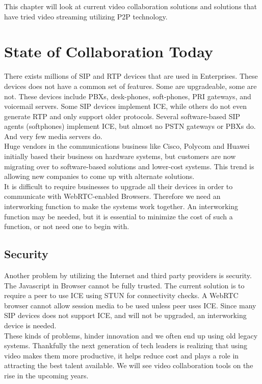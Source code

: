 This chapter will look at current video collaboration solutions and solutions that have tried video streaming utilizing P2P technology.

\section{State of Collaboration Today}
There exists millions of SIP and RTP devices that are used in Enterprises. These devices does not have a common set of features. Some are upgradeable, some are not. These devices include PBXs, desk-phones, soft-phones, PRI gateways, and voicemail servers. Some SIP devices implement ICE, while others do not even generate RTP and only support older protocols. Several software-based SIP agents (softphones) implement ICE, but almost no
PSTN gateways or PBXs do. And very few media servers do.
\\

Huge vendors in the communications business like Cisco, Polycom and Huawei initially based their business on hardware systems, but customers are now migrating over to software-based solutions and lower-cost systems. This trend is allowing new companies to come up with alternate solutions.
\\
It is difficult to require businesses to upgrade all their devices in order to communicate with WebRTC-enabled Browsers. Therefore we need an interworking function to make the systems work together. An interworking function may be needed, but it is essential to minimize the cost of such a function, or not need one to begin with. 
\\

\subsection{Security}
Another problem by utilizing the Internet and third party providers is security. The Javascript in Browser cannot be fully trusted. The current solution is to require a peer to use ICE using STUN for connectivity checks. A WebRTC browser cannot allow session media to be used unless peer uses ICE. Since many SIP devices does not support ICE, and will not be upgraded, an interworking device is needed.
\\
These kinds of problems, hinder innovation and we often end up using old legacy systems. Thankfully the next generation of tech leaders is realizing that using video makes them more productive, it helps reduce cost and plays a role in attracting the best talent available. We will see video collaboration tools on the rise in the upcoming years.


